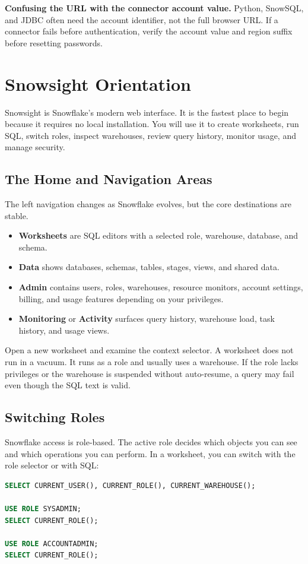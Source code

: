 \begin{pitfall}
\textbf{Confusing the URL with the connector account value.} Python, SnowSQL, and JDBC often need the account identifier, not the full browser URL. If a connector fails before authentication, verify the account value and region suffix before resetting passwords.
\end{pitfall}

\section{Snowsight Orientation}
Snowsight is Snowflake's modern web interface. It is the fastest place to begin because it requires no local installation. You will use it to create worksheets, run SQL, switch roles, inspect warehouses, review query history, monitor usage, and manage security.

\subsection{The Home and Navigation Areas}
The left navigation changes as Snowflake evolves, but the core destinations are stable.
\begin{itemize}
    \item \textbf{Worksheets} are SQL editors with a selected role, warehouse, database, and schema.
    \item \textbf{Data} shows databases, schemas, tables, stages, views, and shared data.
    \item \textbf{Admin} contains users, roles, warehouses, resource monitors, account settings, billing, and usage features depending on your privileges.
    \item \textbf{Monitoring} or \textbf{Activity} surfaces query history, warehouse load, task history, and usage views.
\end{itemize}

Open a new worksheet and examine the context selector. A worksheet does not run in a vacuum. It runs as a role and usually uses a warehouse. If the role lacks privileges or the warehouse is suspended without auto-resume, a query may fail even though the SQL text is valid.

\subsection{Switching Roles}
Snowflake access is role-based. The active role decides which objects you can see and which operations you can perform. In a worksheet, you can switch with the role selector or with SQL:
\begin{lstlisting}[language=SQL,caption={Checking and switching role context in a worksheet.},label={lst:chapter0-role-context}]
SELECT CURRENT_USER(), CURRENT_ROLE(), CURRENT_WAREHOUSE();

USE ROLE SYSADMIN;
SELECT CURRENT_ROLE();

USE ROLE ACCOUNTADMIN;
SELECT CURRENT_ROLE();
\end{lstlisting}

